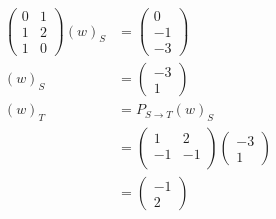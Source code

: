 \documentclass[12pt]{article}
\newenvironment{problem}[2][Problem]{\begin{trivlist}
\item[\hskip \labelsep {\bfseries #1}\hskip \labelsep {\bfseries #2.}]}{\end{trivlist}}
\begin{document}
\begin{problem}{1.c}
\end{problem}
\begin{align*}
\left( \begin{array}{cc}
	0 & 1 \\ 
	1 & 2 \\
	1 & 0 
\end{array} \right)
(w)_S
&= 
\left( \begin{array}{c}
	0 \\
	-1 \\
	-3  
\end{array} \right) \\
(w)_S &= \left( \begin{array}{c}
	-3 \\
	1
\end{array} \right) \\
(w)_T &= P_{S \to T} (w)_S \\
&= 
\left( \begin{array}{cc}
	1 & 2 \\
	-1 & -1\\
\end{array} \right)
\left( \begin{array}{c}
	-3 \\
	1
\end{array} \right) \\
&= \left( \begin{array}{c}
	-1 \\
	2
\end{array} \right)
\end{align*}
\end{document}
